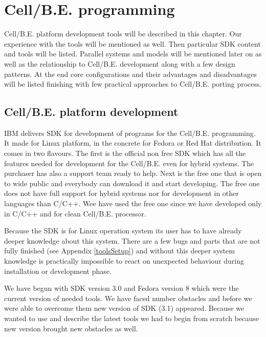 \chapter {\mbox{Cell/B.E.} programming}
\par
\mbox{Cell/B.E.} platform development tools will be described in this chapter.
Our experience with the tools will be mentioned as well.
Then particular SDK content and tools will be listed.
Parallel systems and models will be mentioned later on as well as the relationship to \mbox{Cell/B.E.} development along with a few design patterns.
At the end core configurations and their advantages and disadvantages will be listed finishing with few practical approaches to \mbox{Cell/B.E.} porting process.

\section{\mbox{Cell/B.E.} platform development}
\par
IBM delivers SDK for development of programs for the \mbox{Cell/B.E.} programming.
It made for Linux platform, in the concrete for Fedora or Red Hat distribution.
It comes in two flavours.
The first is the official non free SDK which has all the features needed for development for the \mbox{Cell/B.E.} even for hybrid systems.
The purchaser has also a support team ready to help.
Next is the free one that is open to wide public and everybody can download it and start developing.
The free one does not have full support for hybrid systems nor for development in other languages than C/C++.
Wee have used the free one since we have developed only in C/C++ and for clean \mbox{Cell/B.E.} processor.

\par
Because the SDK is for Linux operation system its user has to have already deeper knowledge about this system.
There are a few bugs and parts that are not fully finished (see Appendix \ref{toolsSetup}) and without this deeper system knowledge is practically impossible to react on unexpected behaviour during installation or development phase.

\par
We have begun with SDK version 3.0 and Fedora version 8 which were the current version of needed tools.
We have faced number obstacles and before we were able to overcome them new version of SDK (3.1) appeared.
Because we wanted to use and describe the latest tools we had to begin from scratch because new version brought new obstacles as well.

